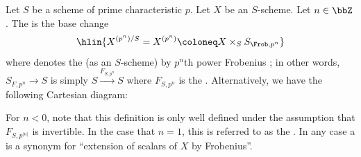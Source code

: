 \begin{definition} \label{definition:extension_of_scalars_of_a_scheme_of_prime_characteristic_by_frobenius}
    Let $S$ be a scheme of prime characteristic $p$. Let $X$ be an $S$-scheme. Let $n \in \bbZ$.
    The  is the base change
    $$\hlin{X^{(p^n)/S} = X^{(p^n)} \coloneq X \times_S S_{\Frob, p^n}}$$
    where  denotes the  (as an $S$-scheme) by $p^n$th power Frobenius ; in other words, $S_{F, p^n} \to S$ is simply $S \xrightarrow{F_{S,p^n}} S$ where $F_{S,p^n}$ is the . Alternatively, we have the following Cartesian diagram:
    \begin{center}
    \end{center}
    For $n < 0$, note that this definition is only well defined under the assumption that $F_{S,p^{|n|}}$ is invertible. In the case that $n = 1$, this is referred to as the . In any case a  is a synonym for ``extension of scalars of $X$ by Frobenius''. 


\end{definition}